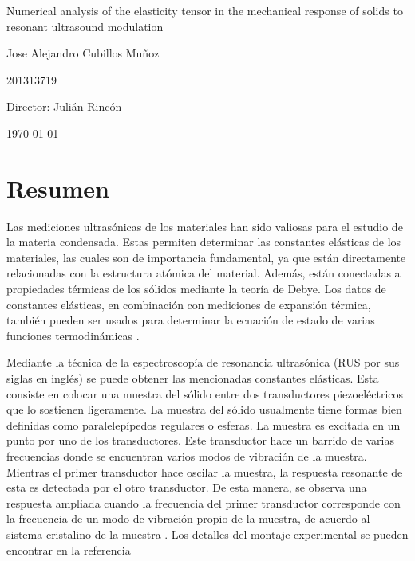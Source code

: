 \documentclass[12pt]{article}
\begin{document}
\begin{center}
\Huge
Numerical analysis of the elasticity tensor in the mechanical response of solids to resonant ultrasound modulation

\vspace{3mm}
\Large Jose Alejandro Cubillos Muñoz

\large
201313719


\vspace{2mm}
\Large
Director: Julián Rincón

\normalsize
\vspace{2mm}

\today
\end{center}


\normalsize

\section{Resumen}

Las mediciones ultrasónicas de los materiales han sido valiosas para el estudio de la materia condensada. Estas permiten determinar las constantes elásticas de los materiales, las cuales son de importancia fundamental, ya que están directamente relacionadas con la estructura atómica del material. Además, están conectadas a propiedades térmicas de los sólidos mediante la teoría de Debye. Los datos de constantes elásticas, en combinación con mediciones de expansión térmica, también pueden ser usados para determinar la ecuación de estado de varias funciones termodinámicas \cite{Leisure_1997}.


Mediante la técnica de la espectroscopía de resonancia ultrasónica (RUS por sus siglas en inglés) se puede obtener las mencionadas constantes elásticas. Esta consiste en colocar una muestra del sólido entre dos transductores piezoeléctricos que lo sostienen ligeramente. La muestra del sólido usualmente tiene formas bien definidas como paralelepípedos regulares o esferas. La muestra es excitada en un punto por uno de los transductores. Este transductor hace un barrido de varias frecuencias donde se encuentran varios modos de vibración de la muestra. Mientras el primer transductor hace oscilar la muestra, la respuesta resonante de esta es detectada por el otro transductor. De esta manera, se observa una respuesta ampliada cuando la frecuencia del primer transductor corresponde con la frecuencia de un modo de vibración propio de la muestra, de acuerdo al sistema cristalino de la muestra \cite{Leisure_1997}. Los detalles del montaje experimental se pueden encontrar en la referencia \cite{MIGLIORI19931}
\end{document}
